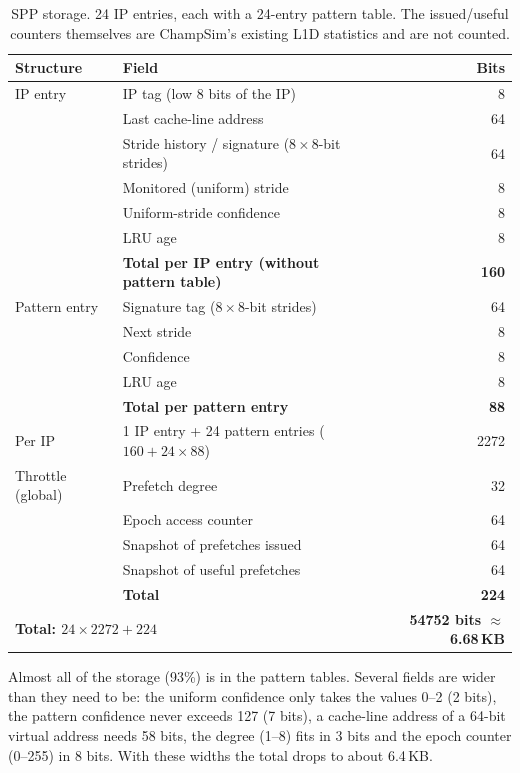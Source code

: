 \documentclass[11pt]{article}
\begin{document}
\begin{table}[H]
\centering
\begin{tabular}{llr}
\toprule
Structure & Field & Bits\\
\midrule
IP entry & IP tag (low 8 bits of the IP) & 8\\
         & Last cache-line address & 64\\
         & Stride history / signature ($8 \times 8$-bit strides) & 64\\
         & Monitored (uniform) stride & 8\\
         & Uniform-stride confidence & 8\\
         & LRU age & 8\\
         & \textbf{Total per IP entry (without pattern table)} & \textbf{160}\\
\midrule
Pattern entry & Signature tag ($8 \times 8$-bit strides) & 64\\
              & Next stride & 8\\
              & Confidence & 8\\
              & LRU age & 8\\
              & \textbf{Total per pattern entry} & \textbf{88}\\
\midrule
Per IP & 1 IP entry + 24 pattern entries ($160 + 24 \times 88$) & 2272\\
\midrule
Throttle (global) & Prefetch degree & 32\\
                  & Epoch access counter & 64\\
                  & Snapshot of prefetches issued & 64\\
                  & Snapshot of useful prefetches & 64\\
                  & \textbf{Total} & \textbf{224}\\
\midrule
\multicolumn{2}{l}{\textbf{Total: $24 \times 2272 + 224$}} & \textbf{54752 bits $\approx$ 6.68\,KB}\\
\bottomrule
\end{tabular}
\caption{SPP storage. 24 IP entries, each with a 24-entry pattern table.
The issued/useful counters themselves are ChampSim's existing L1D statistics
and are not counted.}
\label{tab:t1-storage}
\end{table}

Almost all of the storage (93\%) is in the pattern tables. Several fields are
wider than they need to be: the uniform confidence only takes the values 0--2
(2 bits), the pattern confidence never exceeds 127 (7 bits), a cache-line
address of a 64-bit virtual address needs 58 bits, the degree (1--8) fits in
3 bits and the epoch counter (0--255) in 8 bits. With these widths the total
drops to about 6.4\,KB.
\end{document}
